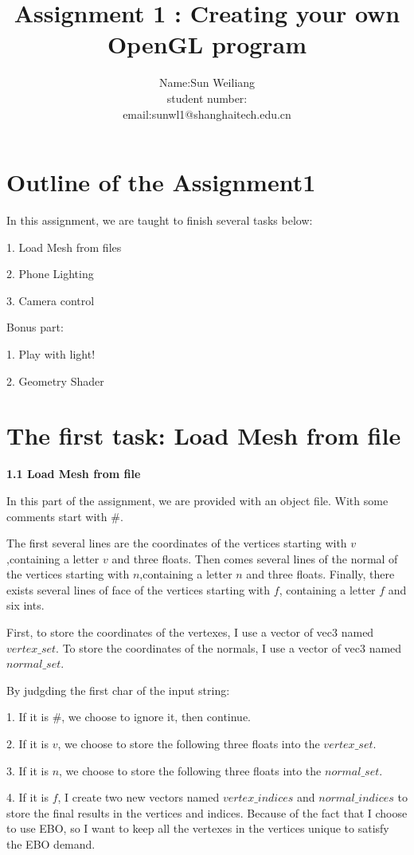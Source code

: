 \documentclass[acmtog]{acmart}
\title{Assignment 1 : Creating your own OpenGL program}
\author{Name:\quad Sun Weiliang  \\ student number:\quad 2020533010
	\\email:\quad sunwl1@shanghaitech.edu.cn}
\begin{document}
\maketitle

\vspace*{2 ex}

\section{Outline of the Assignment1}

In this assignment, we are taught to finish several tasks below:

1. Load Mesh from files

2. Phone Lighting

3. Camera control

Bonus part:

1. Play with light!

2. Geometry Shader

\section{The first task: Load Mesh from file}

\textbf{1.1 Load Mesh from file}

In this part of the assignment, we are provided with an object file. With some comments start with $\#$.

The first several lines are the coordinates of the vertices starting with $v$,containing a letter $v$ and three floats. Then comes several lines of the normal of the vertices starting with $n$,containing a letter $n$ and three floats. Finally, there exists several lines of face of the vertices starting with $f$, containing a letter $f$ and six ints.

First, to store the coordinates of the vertexes, I use a vector of vec3 named $vertex\_set$. To store the coordinates of the normals, I use a vector of vec3 named $normal\_set$.

By judgding the first char of the input string:

1. If it is $\#$, we choose to ignore it, then continue.

2. If it is $v$, we choose to store the following three floats into the $vertex\_set$.

3. If it is $n$, we choose to store the following three floats into the $normal\_set$.

4. If it is $f$, I create two new vectors named $vertex\_indices$ and $normal\_indices$ to store the final results in the vertices and indices. Because of the fact that I choose to use EBO, so I want to keep all the vertexes in the vertices unique to satisfy the EBO demand.
\end{document}
